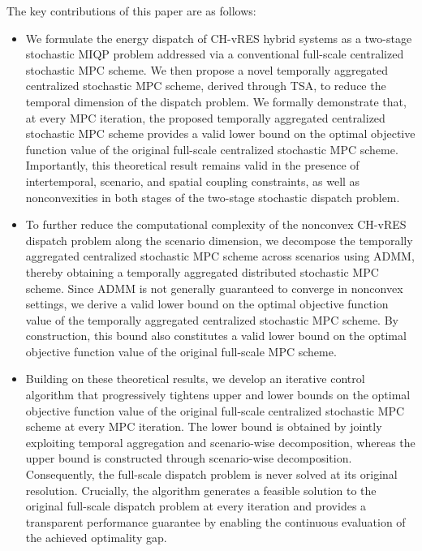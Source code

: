 \documentclass[a4paper,fleqn]{cas-sc}
\begin{document}
The key contributions of this paper are as follows:
\begin{itemize}
\item  We formulate the energy dispatch of CH-vRES hybrid systems as a two-stage stochastic MIQP problem addressed via a conventional full-scale centralized stochastic MPC scheme.
We then propose a novel temporally aggregated centralized stochastic MPC scheme, derived through TSA, to reduce the temporal dimension of the dispatch problem.
We formally demonstrate that, at every MPC iteration, the proposed temporally aggregated centralized stochastic MPC scheme provides a valid lower bound on the optimal objective function value of the original full-scale centralized stochastic MPC scheme.
Importantly, this theoretical result remains valid in the presence of intertemporal, scenario, and spatial coupling constraints, as well as nonconvexities in both stages of the two-stage stochastic dispatch problem.
    
\item To further reduce the computational complexity of the nonconvex CH-vRES dispatch problem along the scenario dimension,
we decompose the temporally aggregated centralized stochastic MPC scheme across scenarios using ADMM, thereby obtaining a temporally aggregated distributed stochastic MPC scheme.
Since ADMM is not generally guaranteed to converge in nonconvex settings, we derive a valid lower bound on the optimal objective function value of the temporally aggregated centralized stochastic MPC scheme.
By construction, this bound also constitutes a valid lower bound on the optimal objective function value of the original full-scale MPC scheme.

\item Building on these theoretical results, we develop an iterative control algorithm that progressively tightens upper and lower bounds on the optimal objective function value of the original full-scale centralized stochastic MPC scheme at every MPC iteration.
The lower bound is obtained by jointly exploiting temporal aggregation and scenario-wise decomposition, whereas the upper bound is constructed through scenario-wise decomposition.
Consequently, the full-scale dispatch problem is never solved at its original resolution.
Crucially, the algorithm generates a feasible solution to the original full-scale dispatch problem at every iteration
and provides a transparent performance guarantee by enabling the continuous evaluation of the achieved optimality gap.

\end{itemize}
\end{document}
